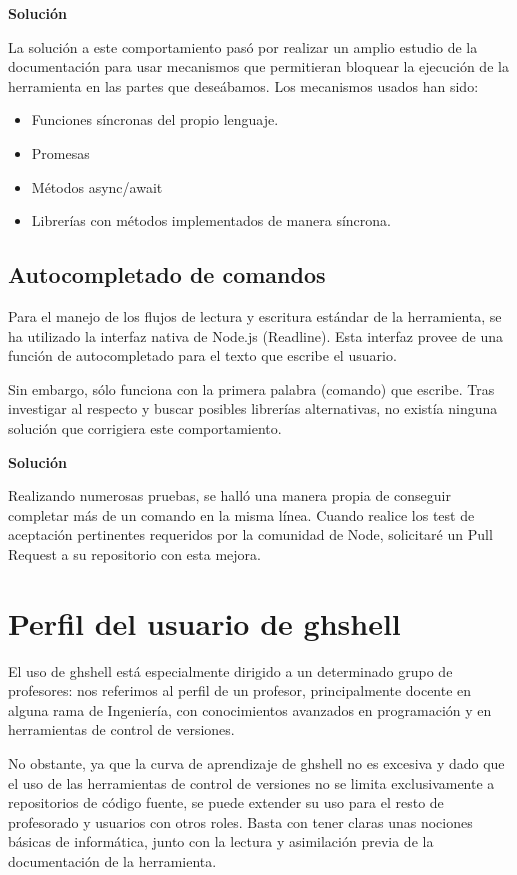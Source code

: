 {\normalsize {\bfseries Solución}}
\bigskip

La solución a este comportamiento pasó por realizar un amplio estudio de la documentación para usar mecanismos que permitieran bloquear la ejecución de la herramienta en las partes que deseábamos. Los mecanismos usados han sido:

\begin{itemize}
	\item Funciones síncronas del propio lenguaje.
	\item Promesas
	\item Métodos async/await
	\item Librerías con métodos implementados de manera síncrona.
\end{itemize}

\subsection{Autocompletado de comandos}
\label{subsec:3.3.2}

Para el manejo de los flujos de lectura y escritura estándar de la herramienta, se ha utilizado la interfaz nativa de Node.js (Readline). Esta interfaz provee de una función de autocompletado para el texto que escribe el usuario.

Sin embargo, sólo funciona con la primera palabra (comando) que escribe. Tras investigar al respecto y buscar posibles librerías alternativas, no existía ninguna solución que corrigiera este comportamiento.
\bigskip

{\normalsize {\bfseries Solución}}
\bigskip

Realizando numerosas pruebas, se halló una manera propia de conseguir completar más de un comando en la misma línea. Cuando realice los test de aceptación pertinentes requeridos por la comunidad de Node, solicitaré un Pull Request a su repositorio con esta mejora.


\section{Perfil del usuario de ghshell}
\label{3:sec:4}

El uso de ghshell está especialmente dirigido a un determinado grupo de profesores: nos referimos al perfil de un profesor, principalmente docente en alguna rama de Ingeniería, con conocimientos avanzados en programación y en herramientas de control de versiones.

No obstante, ya que la curva de aprendizaje de ghshell no es excesiva y dado que el uso de las herramientas de control de versiones no se limita exclusivamente a repositorios de código fuente, se puede extender su uso para el resto de profesorado y usuarios con otros roles. Basta con tener claras unas nociones básicas de informática, junto con la lectura y asimilación previa de la documentación de la herramienta.
